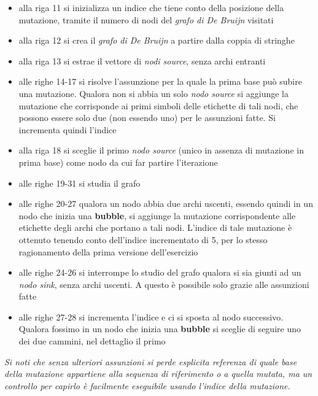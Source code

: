\documentclass[a4paper,12pt, oneside]{book}
\begin{document}
\begin{itemize}
  \item alla riga 11 si inizializza un indice che tiene conto della posizione
  della mutazione, tramite il numero di nodi del \textit{grafo di De Bruijn}
  visitati 
  \item alla riga 12 si crea il \textit{grafo di De Bruijn} a partire dalla
  coppia di stringhe
  \item alla riga 13 si estrae il vettore di \textit{nodi source}, senza archi
  entranti
  \item alle righe 14-17 si risolve l'assunzione per la quale la prima base può
  subire una mutazione. Qualora non si abbia un solo \textit{nodo source} si
  aggiunge la mutazione che corrisponde ai primi simboli delle etichette di tali
  nodi, che possono essere solo due (non essendo uno) per le assunzioni fatte.
  Si incrementa quindi l'indice 
  \item alla riga 18 si sceglie il primo \textit{nodo source} (unico in assenza
  di mutazione in prima base) come nodo da cui far partire l'iterazione
  \item alle righe 19-31 si studia il grafo
  \item alle righe 20-27 qualora un nodo abbia due archi uscenti, essendo quindi
  in un nodo che inizia una \textbf{bubble}, si aggiunge la
  mutazione corrispondente alle etichette degli archi che portano a tali
  nodi. L'indice di tale mutazione è ottenuto tenendo conto dell'indice
  incrementato di 5, per lo stesso ragionamento della prima versione
  dell'esercizio
  \item alle righe 24-26 si interrompe lo studio del grafo qualora si sia giunti
  ad un \textit{nodo sink}, senza archi uscenti. A questo è possibile solo
  grazie alle assunzioni fatte 
  \item alle righe 27-28 si incrementa l'indice e ci si sposta al nodo
  successivo. Qualora fossimo in un nodo che inizia una \textbf{bubble} si
  sceglie di seguire uno dei due cammini, nel dettaglio il primo
\end{itemize}
\textit{Si noti che senza ulteriori assunzioni si perde esplicita referenza di
quale base della mutazione appartiene alla sequenza di riferimento o a quella
mutata, ma un controllo per capirlo è facilmente eseguibile usando l'indice
della mutazione.}\\
\end{document}
